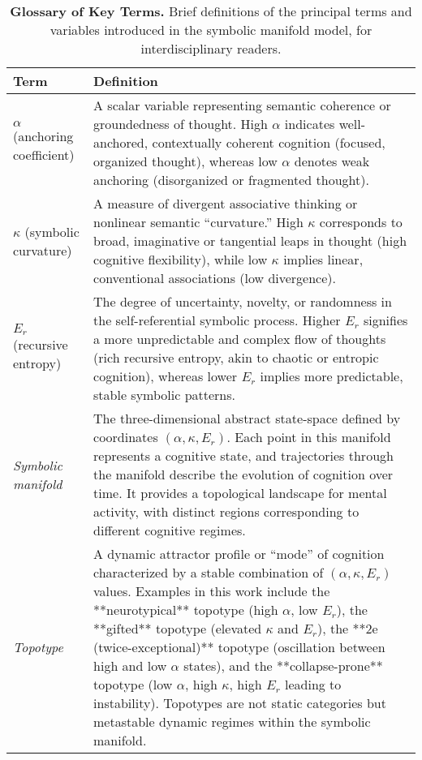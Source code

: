 \begin{table}[t]
\caption{\textbf{Glossary of Key Terms.} Brief definitions of the principal terms and variables introduced in the symbolic manifold model, for interdisciplinary readers.}
\label{tab:glossary}
\renewcommand{\arraystretch}{1.2}
\begin{tabular}{p{3.2cm} p{12cm}}
\textbf{Term} & \textbf{Definition} \\ \hline
$\alpha$ (anchoring coefficient) & A scalar variable representing semantic coherence or groundedness of thought. High $\alpha$ indicates well-anchored, contextually coherent cognition (focused, organized thought), whereas low $\alpha$ denotes weak anchoring (disorganized or fragmented thought). \\
$\kappa$ (symbolic curvature) & A measure of divergent associative thinking or nonlinear semantic “curvature.” High $\kappa$ corresponds to broad, imaginative or tangential leaps in thought (high cognitive flexibility), while low $\kappa$ implies linear, conventional associations (low divergence). \\
$E_r$ (recursive entropy) & The degree of uncertainty, novelty, or randomness in the self-referential symbolic process. Higher $E_r$ signifies a more unpredictable and complex flow of thoughts (rich recursive entropy, akin to chaotic or entropic cognition), whereas lower $E_r$ implies more predictable, stable symbolic patterns. \\
\textit{Symbolic manifold} & The three-dimensional abstract state-space defined by coordinates $(\alpha,\kappa,E_r)$. Each point in this manifold represents a cognitive state, and trajectories through the manifold describe the evolution of cognition over time. It provides a topological landscape for mental activity, with distinct regions corresponding to different cognitive regimes. \\
\textit{Topotype} & A dynamic attractor profile or “mode” of cognition characterized by a stable combination of $(\alpha,\kappa,E_r)$ values. Examples in this work include the **neurotypical** topotype (high $\alpha$, low $E_r$), the **gifted** topotype (elevated $\kappa$ and $E_r$), the **2e (twice-exceptional)** topotype (oscillation between high and low $\alpha$ states), and the **collapse-prone** topotype (low $\alpha$, high $\kappa$, high $E_r$ leading to instability). Topotypes are not static categories but metastable dynamic regimes within the symbolic manifold. \\ \hline
\end{tabular}
\end{table}